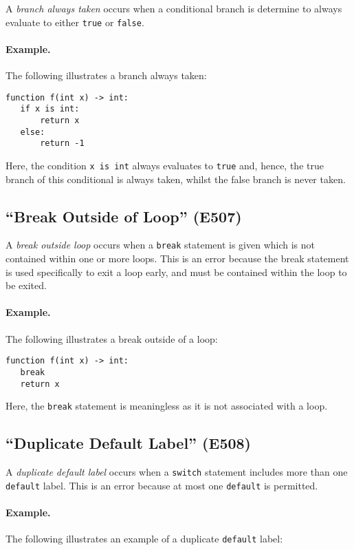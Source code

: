 A {\em branch always taken} occurs when a conditional branch is determine to always evaluate to either \lstinline{true} or \lstinline{false}.  

\paragraph{Example.} The following illustrates a branch always taken:

\begin{lstlisting}
function f(int x) -> int:
   if x is int:
       return x
   else:
       return -1
\end{lstlisting}

Here, the condition \lstinline{x is int} always evaluates to \lstinline{true} and, hence, the true branch of this conditional is always taken, whilst the false branch is never taken.

\subsection{``Break Outside of Loop'' (E507)}

A {\em break outside loop} occurs when a \lstinline{break} statement is given which is not contained within one or more loops.  This is an error because the break statement is used specifically to exit a loop early, and must be contained within the loop to be exited.  

\paragraph{Example.}  The following illustrates a break outside of a loop:

\begin{lstlisting}
function f(int x) -> int:
   break
   return x
\end{lstlisting}

Here, the \lstinline{break} statement is meaningless as it is not associated with a loop.

\subsection{``Duplicate Default Label'' (E508)}
A {\em duplicate default label} occurs when a \lstinline{switch} statement includes more than one \lstinline{default} label.  This is an error because at most one \lstinline{default} is permitted.

\paragraph{Example.}  The following illustrates an example of a duplicate \lstinline{default} label:


